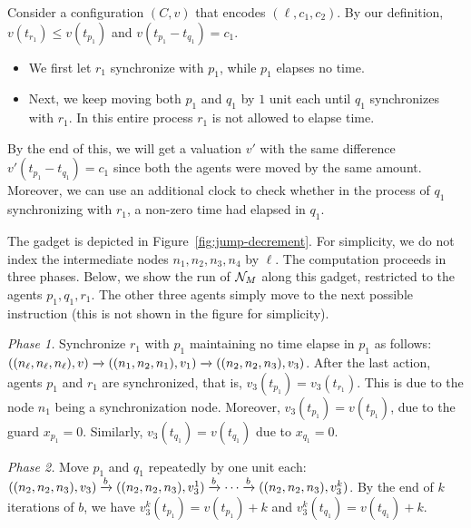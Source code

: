 Consider a configuration $(C, v)$ that encodes $(\ell, c_1, c_2)$. By our definition, $v(t_{r_1}) \le v(t_{p_1})$ and $v(t_{p_1} - t_{q_1}) = c_1$. 
\begin{itemize}
 
\item We first let $r_1$ synchronize with $p_1$, while $p_1$
  elapses no time.
\item Next, we keep moving both $p_1$ and $q_1$ by $1$ unit each until
  $q_1$ synchronizes with $r_1$. In this entire process $r_1$ is not
  allowed to elapse time.
\end{itemize}
By the end of this, we will get a valuation $v'$ with the same difference $v'(t_{p_1} - t_{q_1}) = c_1$
since both the agents were moved by the same amount. Moreover, we can
use an additional clock to check whether in the process of $q_1$
synchronizing with $r_1$, a non-zero time had elapsed in $q_1$.

The gadget is depicted in Figure~\ref{fig:jump-decrement}. For simplicity, we do not index the intermediate nodes $n_1, n_2, n_3, n_4$ by $\ell$. The computation proceeds in three phases. Below, we show the run of $\mathcal{N}_M$ along this gadget, restricted to the agents $p_1, q_1, r_1$. The other three agents simply move to the next possible instruction (this is not shown in the figure for simplicity). 

\smallskip

\noindent \emph{Phase 1.} Synchronize $r_1$ with $p_1$ maintaining no time
elapse in $p_1$ as follows: $((n_\ell, n_\ell, n_\ell), v) \xrightarrow{}
((n_1, n_2, n_1), v_1) \xrightarrow{} ((n_2, n_2, n_3), v_3)$. After the last
action, agents $p_1$ and $r_1$ are synchronized, that is,
$v_3(t_{p_1}) = v_3(t_{r_1})$. This is due to the node $n_1$ being a
synchronization node. Moreover, $v_3(t_{p_1}) = v(t_{p_1})$, due to
the guard $x_{p_1} = 0$. Similarly, $v_3(t_{q_1}) = v(t_{q_1})$ due to
$x_{q_1} = 0$.

\smallskip

\noindent \emph{Phase 2.} Move $p_1$ and $q_1$ repeatedly by one unit each:  $((n_2, n_2, n_3), v_3) \xrightarrow{b} ((n_2, n_2, n_3), v_3^1) \xrightarrow{b} \cdots \xrightarrow{b} ((n_2, n_2, n_3), v_3^k)$. By the end of $k$ iterations of $b$, we have $v^k_3(t_{p_1}) = v(t_{p_1}) + k$ and $v^k_3(t_{q_1}) = v(t_{q_1}) + k$.

\smallskip

